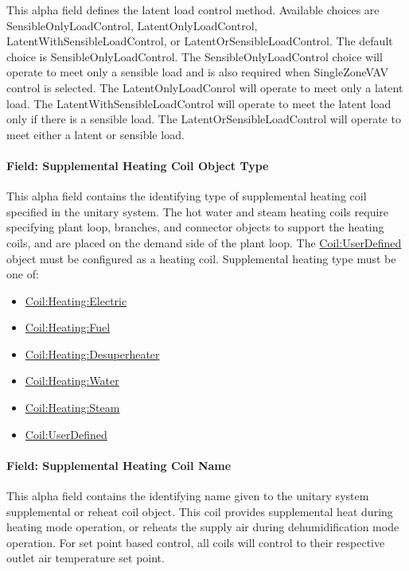 This alpha field defines the latent load control method. Available choices are SensibleOnlyLoadControl, LatentOnlyLoadControl, LatentWithSensibleLoadControl, or LatentOrSensibleLoadControl. The default choice is SensibleOnlyLoadControl. The SensibleOnlyLoadControl choice will operate to meet only a sensible load and is also required when SingleZoneVAV control is selected. The LatentOnlyLoadConrol will operate to meet only a latent load. The LatentWithSensibleLoadControl will operate to meet the latent load only if there is a sensible load. The LatentOrSensibleLoadControl will operate to meet either a latent or sensible load.

\paragraph{Field: Supplemental Heating Coil Object Type}\label{field-supplemental-heating-coil-object-type}

This alpha field contains the identifying type of supplemental heating coil specified in the unitary system. The hot water and steam heating coils require specifying plant loop, branches, and connector objects to support the heating coils, and are placed on the demand side of the plant loop. The \hyperref[coiluserdefined]{Coil:UserDefined} object must be configured as a heating coil. Supplemental heating type must be one of:

\begin{itemize}
\item
  \hyperref[coilheatingelectric]{Coil:Heating:Electric}
\item
  \hyperref[coilheatinggas-000]{Coil:Heating:Fuel}
\item
  \hyperref[coilheatingdesuperheater]{Coil:Heating:Desuperheater}
\item
  \hyperref[coilheatingwater]{Coil:Heating:Water}
\item
  \hyperref[coilheatingsteam]{Coil:Heating:Steam}
\item
  \hyperref[coiluserdefined]{Coil:UserDefined}
\end{itemize}

\paragraph{Field: Supplemental Heating Coil Name}\label{field-supplemental-heating-coil-name}

This alpha field contains the identifying name given to the unitary system supplemental or reheat coil object. This coil provides supplemental heat during heating mode operation, or reheats the supply air during dehumidification mode operation. For set point based control, all coils will control to their respective outlet air temperature set point.

